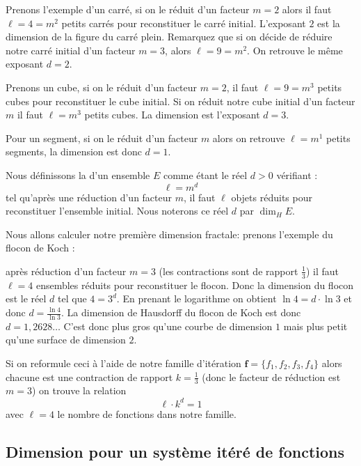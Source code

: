 \documentclass[11pt,class=report,crop=false]{standalone}
\newcommand{\commentfigure}[1]{#1} %
\begin{document}
Prenons l'exemple d'un carré, si on le réduit d'un facteur $m=2$
alors il faut $\ell=4=m^2$ petits carrés pour reconstituer le carré initial.
L'exposant $2$ est la dimension de la figure du carré plein. Remarquez que si
on décide de réduire notre carré initial d'un facteur $m=3$,
alors $\ell=9=m^2$. On retrouve le même exposant $d=2$.


Prenons un cube, si on le réduit d'un facteur $m=2$, il faut 
$\ell=9=m^3$ petits cubes pour reconstituer le cube initial.
Si on réduit notre cube initial d'un facteur $m$ il faut
$\ell=m^3$ petits cubes. La dimension est l'exposant $d=3$.


Pour un segment, si on le réduit d'un facteur $m$ alors on retrouve
$\ell=m^1$ petits segments, la dimension est donc $d=1$.


Nous définissons la  d'un ensemble $E$ comme étant le réel $d>0$
vérifiant :
$$\ell=m^d$$
tel qu'après une réduction d'un facteur $m$, il faut $\ell$ objets 
réduits pour reconstituer l'ensemble initial. Nous noterons ce réel $d$ par $\dim_H E$.


Nous allons calculer notre première dimension fractale:
prenons l'exemple du flocon de Koch : 
\commentfigure{
}
après réduction d'un facteur $m=3$ (les contractions sont de rapport $\frac 13$)
il faut $\ell = 4$ ensembles réduits pour reconstituer le flocon.
Donc la dimension du flocon est le réel $d$ tel que $4= 3^d$.
En prenant le logarithme on obtient $\ln 4 = d\cdot \ln 3$ et 
donc $d = \frac{\ln 4}{\ln 3}$.
La dimension de Hausdorff du flocon de Koch est donc $d=1,2628\ldots$
C'est donc \og plus gros \fg{} qu'une courbe de dimension $1$ mais \og plus petit \fg{} 
qu'une surface de dimension $2$.

Si on reformule ceci à l'aide de notre famille d'itération $\mathbf{f}=\{f_1,f_2,f_3,f_4\}$
alors chacune est une contraction de rapport $k=\frac 13$ (donc le facteur de réduction est $m=3$)
on trouve la relation 
$$\ell \cdot k^d = 1$$
avec $\ell=4$ le nombre de fonctions dans notre famille. 





\subsection{Dimension pour un système itéré de fonctions}
\end{document}
